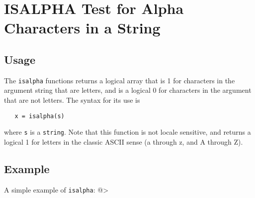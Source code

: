 \section{ISALPHA Test for Alpha Characters in a String}

\subsection{Usage}

The \verb|isalpha| functions returns a logical array that is 1 
for characters in the argument string that are letters, and 
is a logical 0 for characters in the argument that are not
letters.  The syntax for its use is
\begin{verbatim}
   x = isalpha(s)
\end{verbatim}
where \verb|s| is a \verb|string|.  Note that this function is not
locale sensitive, and returns a logical 1 for letters in the
classic ASCII sense (a through z, and A through Z).
\subsection{Example}

A simple example of \verb|isalpha|:
@>
